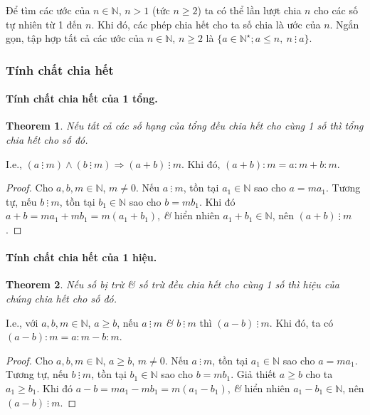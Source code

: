\documentclass{article}
\numberwithin{equation}{section}
\newtheorem{theorem}{Theorem}[section]
\begin{document}
Để tìm các ước của $n\in\mathbb{N}$, $n > 1$ (tức $n\ge 2$) ta có thể lần lượt chia $n$ cho các số tự nhiên từ 1 đến $n$. Khi đó, các phép chia hết cho ta số chia là ước của $n$. Ngắn gọn, tập hợp tất cả các ước của $n\in\mathbb{N}$, $n\ge 2$ là $\{a\in\mathbb{N}^\star;a\le n,\ n\ \vdots\ a\}$.

\subsubsection{Tính chất chia hết}

\paragraph{Tính chất chia hết của 1 tổng.}
\begin{theorem}
	Nếu tất cả các số hạng của tổng đều chia hết cho cùng 1 số thì tổng chia hết cho số đó.
\end{theorem}
I.e., $(a\ \vdots\ m)\land(b\ \vdots\ m)\Rightarrow(a + b)\ \vdots\ m$. Khi đó, $(a + b):m = a:m + b:m$.

\begin{proof}[Proof]
	Cho $a,b,m\in\mathbb{N}$, $m\ne 0$. Nếu $a\ \vdots\ m$, tồn tại $a_1\in\mathbb{N}$ sao cho $a = ma_1$. Tương tự, nếu $b\ \vdots\ m$, tồn tại $b_1\in\mathbb{N}$ sao cho $b = mb_1$. Khi đó $a + b = ma_1 + mb_1 = m(a_1 + b_1)$, \textit{\&} hiển nhiên $a_1 + b_1\in\mathbb{N}$, nên $(a + b)\ \vdots\ m$.
\end{proof}

\paragraph{Tính chất chia hết của 1 hiệu.}
\begin{theorem}
	Nếu số bị trừ \textit{\&} số trừ đều chia hết cho cùng 1 số thì hiệu của chúng chia hết cho số đó.
\end{theorem}
I.e., với $a,b,m\in\mathbb{N}$, $a\ge b$, nếu $a\ \vdots\ m$ \textit{\&} $b\ \vdots\ m$ thì $(a - b)\ \vdots\ m$. Khi đó, ta có $(a - b):m = a:m - b:m$.

\begin{proof}[Proof]
	Cho $a,b,m\in\mathbb{N}$, $a\ge b$, $m\ne 0$. Nếu $a\ \vdots\ m$, tồn tại $a_1\in\mathbb{N}$ sao cho $a = ma_1$. Tương tự, nếu $b\ \vdots\ m$, tồn tại $b_1\in\mathbb{N}$ sao cho $b = mb_1$. Giả thiết $a\ge b$ cho ta $a_1\ge b_1$. Khi đó $a - b = ma_1 - mb_1 = m(a_1 - b_1)$, \textit{\&} hiển nhiên $a_1 - b_1\in\mathbb{N}$, nên $(a - b)\ \vdots\ m$.
\end{proof}
\end{document}
